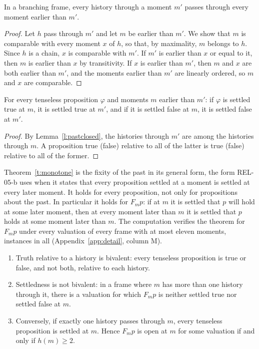 \documentclass{situationist-preprint}
\begin{document}
\begin{lemma}\label{l:pastclosed}
In a branching frame, every history through a moment $m'$ passes through every moment earlier than $m'$.
\end{lemma}

\begin{proof}
Let $h$ pass through $m'$ and let $m$ be earlier than $m'$. We show that $m$ is comparable with every moment $x$ of $h$, so that, by maximality, $m$ belongs to $h$. Since $h$ is a chain, $x$ is comparable with $m'$. If $m'$ is earlier than $x$ or equal to it, then $m$ is earlier than $x$ by transitivity. If $x$ is earlier than $m'$, then $m$ and $x$ are both earlier than $m'$, and the moments earlier than $m'$ are linearly ordered, so $m$ and $x$ are comparable.
\end{proof}

\begin{theorem}\label{t:monotone}
For every tenseless proposition $\varphi$ and moments $m$ earlier than $m'$: if $\varphi$ is settled true at $m$, it is settled true at $m'$, and if it is settled false at $m$, it is settled false at $m'$.
\end{theorem}

\begin{proof}
By Lemma~\ref{l:pastclosed}, the histories through $m'$ are among the histories through $m$. A proposition true (false) relative to all of the latter is true (false) relative to all of the former.
\end{proof}

Theorem~\ref{t:monotone} is the fixity of the past in its general form, the form REL-05-b uses when it states that every proposition settled at a moment is settled at every later moment. It holds for every proposition, not only for propositions about the past. In particular it holds for $F_m p$: if at $m$ it is settled that $p$ will hold at some later moment, then at every moment later than $m$ it is settled that $p$ holds at some moment later than $m$. The computation verifies the theorem for $F_m p$ under every valuation of every frame with at most eleven moments, \NMonoChecks{} instances in all (Appendix~\ref{app:detail}, column M).

\begin{proposition}\label{p:bivalence}
\begin{enumerate}[label=(\alph*)]
\item Truth relative to a history is bivalent: every tenseless proposition is true or false, and not both, relative to each history.
\item Settledness is not bivalent: in a frame where $m$ has more than one history through it, there is a valuation for which $F_m p$ is neither settled true nor settled false at $m$.
\item Conversely, if exactly one history passes through $m$, every tenseless proposition is settled at $m$. Hence $F_m p$ is open at $m$ for some valuation if and only if $h(m) \geq 2$.
\end{enumerate}
\end{proposition}
\end{document}
